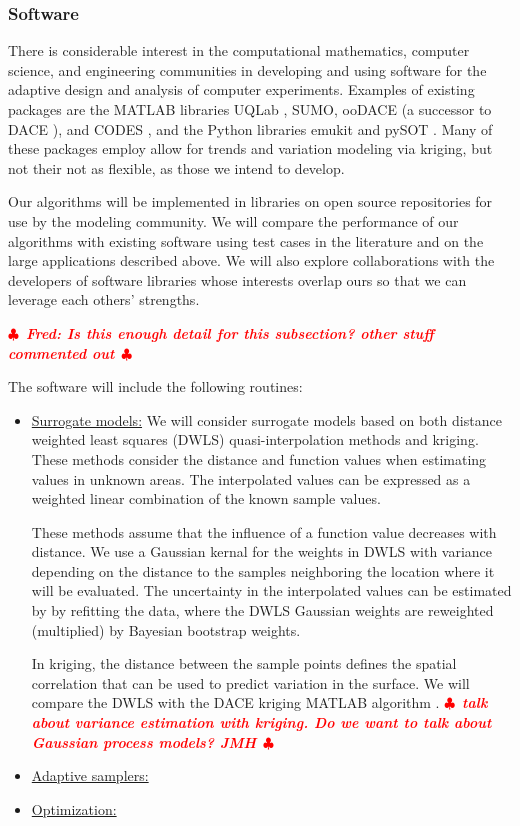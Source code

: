 \documentclass[11pt]{NSFamsart}
\newif\ifnotesw \noteswtrue
\newcommand{\notes}[1]{\ifnotesw \textcolor{red}{  $\clubsuit$\ {\sf \bf \it  #1}\ $\clubsuit$  }\fi}
\begin{document}
\subsubsection{Software}
There is considerable interest in the computational mathematics, computer science, and engineering communities in developing and using software for the adaptive design and analysis of computer experiments.  Examples of existing packages are the MATLAB libraries UQLab \cite{UQLab2014}, SUMO\cite{SUMO2010}, ooDACE \cite{ooDACE2014} (a successor to DACE \cite{dace2002}), and CODES \cite{CODES2015}, and the Python libraries emukit \cite{emukit2019} and pySOT \cite{pySOT2015}.  Many of these packages employ allow for trends and variation modeling via kriging, but not their not as flexible, as those we intend to develop.

Our algorithms will be implemented in libraries on open source repositories for use by the modeling community.  We will compare the performance of our algorithms with existing software using test cases in the literature and on the large applications described above.  We will also explore collaborations with the developers of software libraries whose interests overlap ours so that we can leverage each others' strengths.

\notes{Fred:  Is this enough detail for this subsection? other stuff commented out}

\iffalse
The software will include the following routines:
\begin{itemize}
\item \underline{Surrogate models:} We will consider surrogate models based on both distance weighted least squares (DWLS) quasi-interpolation methods and kriging.  
These methods consider the distance and function values when estimating values in unknown areas. The interpolated values can be expressed as a weighted linear combination of the known sample values. 

These methods assume that the influence of a function value decreases with distance.  We use a Gaussian kernal for the weights in DWLS with variance depending on the distance to the samples neighboring the location where it will be evaluated.
The uncertainty in the interpolated values can be estimated by  by refitting the data, where the DWLS Gaussian weights are reweighted (multiplied) by Bayesian bootstrap weights.  

In kriging,  the distance between the sample points defines the spatial correlation that can be used to predict variation in the surface. We will compare the DWLS with the DACE kriging MATLAB algorithm \cite{}. \notes{talk about variance estimation with kriging.  Do we want to talk about Gaussian process models? JMH}


\item \underline{Adaptive samplers:}

\item \underline{Optimization:}

\end{itemize}
\end{document}
